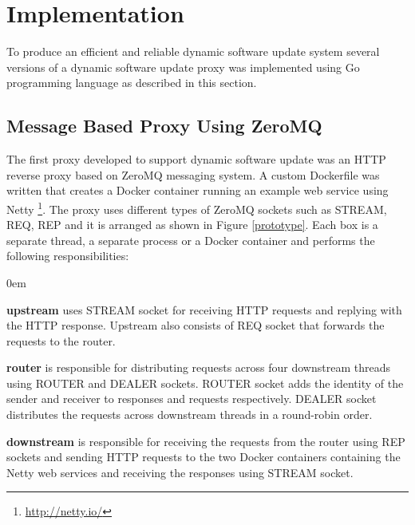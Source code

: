 \documentclass[a4paper,11pt,twoside]{article}
\begin{document}
\clearpage
\section{Implementation} \label{Implementation}
To produce an efficient and reliable dynamic software update system several versions of a dynamic software update proxy was implemented using Go programming language as described in this section. 

\subsection{Message Based Proxy Using ZeroMQ}
The first proxy developed to support dynamic software update was an HTTP reverse proxy based on ZeroMQ messaging system. A custom Dockerfile was written that creates a Docker container running an example web service using Netty \footnote{\url{http://netty.io/}}. The proxy uses different types of ZeroMQ sockets such as STREAM, REQ, REP and it is arranged as shown in Figure \ref{prototype}. Each box is a separate thread, a separate process or a Docker container and performs the following responsibilities:
 
\begin{list}{-}{}
  \itemsep0em
  \item \textbf{upstream} uses STREAM socket for receiving HTTP requests and replying with the HTTP response. Upstream also consists of REQ socket that forwards the requests to the router. 
  
  \item \textbf{router} is responsible for distributing requests across four downstream threads using ROUTER and DEALER sockets. ROUTER socket adds the identity of the sender and receiver to responses and requests respectively. DEALER socket distributes the requests across downstream threads in a round-robin order.
 
  \item \textbf{downstream} is responsible for receiving the requests from the router using REP sockets and sending HTTP requests to the two Docker containers containing the Netty web services and receiving the responses using STREAM socket.
\end{list}
\end{document}
